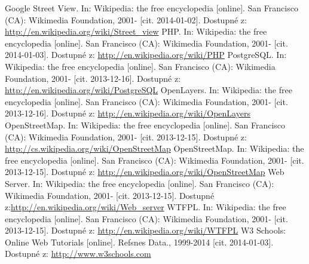 \documentclass[11pt,a4paper,titlepage,oneside]{book}
\begin{document}
\begin{thebibliography}{99}
        Google Street View. In: Wikipedia: the free encyclopedia [online]. San Francisco (CA): Wikimedia Foundation, 2001- [cit. 2014-01-02]. Dostupné z: \url{http://en.wikipedia.org/wiki/Street_view}
	PHP. In: Wikipedia: the free encyclopedia [online]. San Francisco (CA): Wikimedia Foundation, 2001- [cit. 2014-01-03]. Dostupné z: \url{http://en.wikipedia.org/wiki/PHP}
	PostgreSQL. In: Wikipedia: the free encyclopedia [online]. San Francisco (CA): Wikimedia Foundation, 2001- [cit. 2013-12-16]. Dostupné z: \url{http://en.wikipedia.org/wiki/PostgreSQL}
	OpenLayers. In: Wikipedia: the free encyclopedia [online]. San Francisco (CA): Wikimedia Foundation, 2001- [cit. 2013-12-16]. Dostupné z: \url{http://en.wikipedia.org/wiki/OpenLayers}
	OpenStreetMap. In: Wikipedia: the free encyclopedia [online]. San Francisco (CA): Wikimedia Foundation, 2001- [cit. 2013-12-15]. Dostupné z: \url{http://cs.wikipedia.org/wiki/OpenStreetMap}
	OpenStreetMap. In: Wikipedia: the free encyclopedia [online]. San Francisco (CA): Wikimedia Foundation, 2001- [cit. 2013-12-15]. Dostupné z: \url{http://en.wikipedia.org/wiki/OpenStreetMap}
	Web Server. In: Wikipedia: the free encyclopedia [online]. San Francisco (CA): Wikimedia Foundation, 2001- [cit. 2013-12-15]. Dostupné z:\url{http://en.wikipedia.org/wiki/Web_server}
	 WTFPL. In: Wikipedia: the free encyclopedia [online]. San Francisco (CA): Wikimedia Foundation, 2001- [cit. 2013-12-15]. Dostupné z: \url{http://en.wikipedia.org/wiki/WTFPL}
	W3 Schools: Online Web Tutorials [online]. Refsnes Data., 1999-2014 [cit. 2014-01-03]. Dostupné z: \url{http://www.w3schools.com}
\end{thebibliography}
\end{document}
